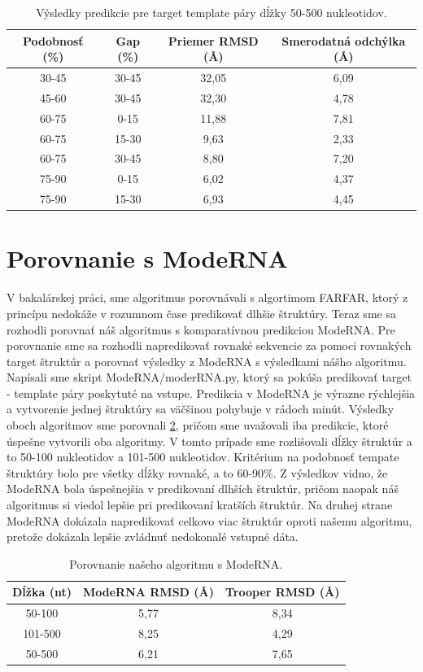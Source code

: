 \begin{table}[b!]
\centering
\begin{tabular}{cccc}
\toprule
Podobnosť (\%) & Gap (\%)  & Priemer RMSD (Å) & Smerodatná odchýlka  (Å)\\
\midrule
30-45  & 30-45 & 32,05 & 6,09 \\
45-60  & 30-45 & 32,30 & 4,78 \\
60-75  &   0-15 & 11,88 & 7,81 \\
60-75  & 15-30 &   9,63 & 2,33 \\
60-75  & 30-45 &   8,80 & 7,20 \\
75-90  &   0-15 &   6,02 & 4,37 \\
75-90  & 15-30 &   6,93 & 4,45 \\
\bottomrule
\end{tabular}
\caption{Výsledky predikcie pre target template páry dĺžky 50-500 nukleotidov. }\label{tab4.1}
\end{table}


\section{Porovnanie s ModeRNA}
V bakalárskej práci, sme algoritmus porovnávali s algortimom FARFAR,  ktorý z princípu nedokáže v rozumnom čase predikovať dlhšie štruktúry. Teraz sme sa rozhodli porovnať náš algoritmus s komparatívnou predikciou ModeRNA. Pre porovnanie sme sa rozhodli napredikovať rovnaké sekvencie za pomoci rovnakých target štruktúr a porovnať  výsledky z ModeRNA s výsledkami nášho algoritmu. Napísali sme skript ModeRNA/moderRNA.py, ktorý sa pokúša predikovať target - template páry poskytuté na vstupe. Predikcia v ModeRNA je výrazne rýchlejšia a vytvorenie jednej štruktúry sa väčšinou pohybuje v rádoch minút. Výsledky oboch algoritmov sme porovnali \ref{tab4.2}, pričom sme uvažovali iba predikcie, ktoré úspešne vytvorili oba algoritmy. V tomto prípade sme rozlišovali dĺžky štruktúr a to 50-100 nukleotidov a 101-500 nukleotidov. Kritérium na podobnosť tempate štruktúry bolo pre všetky dĺžky rovnaké, a to 60-90\%. Z výsledkov vidno, že ModeRNA bola úspešnejšia v predikovaní dlhších štruktúr, pričom naopak náš algoritmus si viedol lepšie pri predikovaní kratších štruktúr. Na druhej strane ModeRNA dokázala napredikovať celkovo viac štruktúr oproti našemu algoritmu, pretože dokázala lepšie zvládnuť nedokonalé vstupné dáta.

\begin{table}[b!]
\centering
\begin{tabular}{ccc}
\toprule
Dĺžka (nt) & ModeRNA RMSD (Å) & Trooper RMSD (Å) \\
\midrule
50-100    & 5,77 & 8,34  \\
101-500  & 8,25 & 4,29  \\
\bottomrule
50-500  & 6,21 & 7,65  \\
\end{tabular}
\caption{Porovnanie našeho algoritmu s ModeRNA. }\label{tab4.2}
\end{table}

